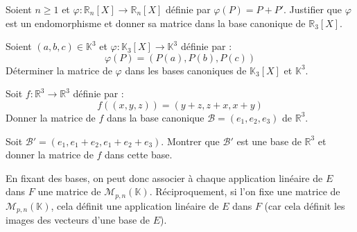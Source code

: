 \documentclass[a4paper,10pt]{report}
\begin{document}
\newpage

\begin{ex}\label{det} Soient $n \geq 1$ et $\varphi : \mathbb{R}_n[X] \rightarrow \mathbb{R}_n[X]$ définie par $\varphi(P)=P+P'$. Justifier que $\varphi$ est un endomorphisme et donner sa matrice dans la base canonique de  $\mathbb{R}_3[X]$.


\vspace{7cm}


%
\end{ex}

\medskip

\begin{exa} Soient $(a,b,c) \in \mathbb{K}^3$ et $\varphi : \mathbb{K}_3[X] \rightarrow \mathbb{K}^3$ définie par :
$$ \varphi(P) = (P(a), P(b), P(c))$$
Déterminer la matrice de $\varphi$ dans les bases canoniques de $\mathbb{K}_3[X]$ et $\mathbb{K}^3$.
\end{exa}

\begin{exa} Soit $f : \mathbb{R}^3 \rightarrow \mathbb{R}^3$ définie par :
$$ f((x,y,z)) = (y+z, z+x, x+y)$$
Donner la matrice de $f$ dans la base canonique $\mathcal{B}=(e_1,e_2,e_3)$ de $\mathbb{R}^3$. 

\noindent Soit $\mathcal{B}'=(e_1, e_1+e_2, e_1+e_2+e_3)$. Montrer que $\mathcal{B}'$ est une base de $\mathbb{R}^3$ et donner la matrice de $f$  dans cette base.
\end{exa}

\medskip

\noindent En fixant des bases, on peut donc associer à chaque application linéaire de $E$ dans $F$ une matrice de $\mathcal{M}_{p,n}(\mathbb{K})$. Réciproquement, si l'on fixe une matrice de $\mathcal{M}_{p,n}(\mathbb{K})$, cela définit une application linéaire de $E$ dans $F$ (car cela définit les images des vecteurs d'une base de $E$).
\end{document}
